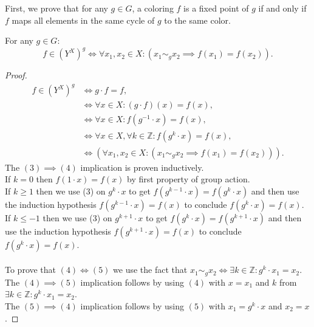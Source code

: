 First, we prove that for any $g \in G$, a coloring $f$ is a fixed point of $g$ if and only if $f$ maps all elements in the same cycle of $g$ to the same color.
\begin{proposition}
  \label{prop:f-mem-fixedBy-iff-forall-eq-to-eq}
  \leanok
  For any $g \in G$:
  \begin{equation*}
    f \in (Y^X)^g \iff \forall x_1, x_2 \in X: (x_1 \sim_g x_2 \implies f(x_1) = f(x_2)).
  \end{equation*}
\end{proposition}

\begin{proof}
  \leanok
  \begin{align}
    f \in (Y^X)^g &\iff g \cdot f = f, \\
                  &\iff \forall x \in X: (g \cdot f)(x) = f(x), \\
                  &\iff \forall x \in X: f(g^{-1} \cdot x) = f(x), \\
                  &\iff \forall x \in X, \forall k \in \mathbb{Z}: f(g^k \cdot x) = f(x), \\
                  &\iff (\forall x_1, x_2 \in X: (x_1 \sim_g x_2 \implies f(x_1) = f(x_2))).
  \end{align}
  The $(3) \implies (4)$ implication is proven inductively.\\
  If $k = 0$ then $f(1 \cdot x) = f(x)$ by first property of group action.\\
  If $k \geq 1$ then we use (3) on $g^{k} \cdot x$ to get $f(g^{k - 1} \cdot x) = f(g^k \cdot x)$ and then use the induction hypothesis $f(g^{k - 1} \cdot x) = f(x)$ to conclude $f(g^k \cdot x) = f(x)$.\\
  If $k \leq -1$ then we use (3) on $g^{k + 1} \cdot x$ to get $f(g^k \cdot x) = f(g^{k + 1} \cdot x)$ and then use the induction hypothesis $f(g^{k + 1} \cdot x) = f(x)$  to conclude $f(g^k \cdot x) = f(x)$.\\
  \\
  To prove that $(4) \iff (5)$ we use the fact that $x_1 \sim_g x_2 \iff \exists k \in \mathbb{Z}: g^k \cdot x_1 = x_2$.\\
  The $(4) \implies (5)$ implication follows by using $(4)$ with $x = x_1$ and $k$ from $\exists k \in \mathbb{Z}: g^k \cdot x_1 = x_2$.\\
  The $(5) \implies (4)$ implication follows by using $(5)$ with $x_1 = g^k \cdot x$ and $x_2 = x$.
\end{proof}

